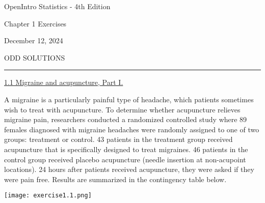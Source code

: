 \documentclass[10pt,letterpaper,unboxed,cm]{exam}
\begin{document}
\setlength{\parskip}{4pt}
\hfill{OpenIntro Statistics - 4th Edition}

\hfill{Chapter 1 Exercises}

\hfill{December 12, 2024}

\hfill{ODD SOLUTIONS}
\setlength{\parskip}{8pt}
\rule{\linewidth}{2pt}



\begin{questions}



	\question \underline{1.1 Migraine and acupuncture, Part I.}

    A migraine is a particularly painful type of headache, which patients sometimes wish to treat with acupuncture. To determine whether acupuncture relieves migraine pain, researchers conducted a randomized controlled study where 89 females diagnosed with migraine headaches were randomly assigned to one of two groups: treatment or control. 43 patients in the treatment group received acupuncture that is specifically designed to treat migraines. 46 patients in the control group received placebo acupuncture (needle insertion at non-acupoint locations). 24 hours after patients received acupuncture, they were asked if they were pain free. Results are summarized in the contingency table below.

    \texttt{[image: exercise1.1.png]}
    
\end{questions}
\end{document}
